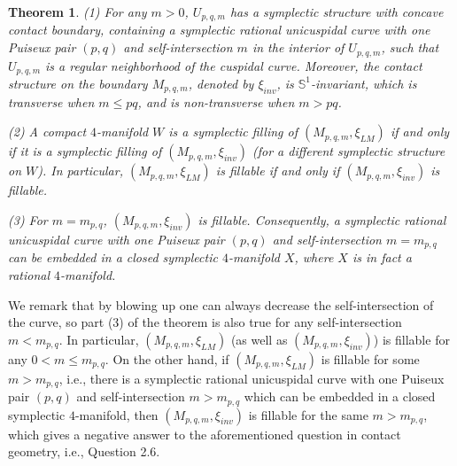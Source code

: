 \documentclass[11pt]{amsart}
\theoremstyle{plain}
\newtheorem{theorem}{Theorem}
\numberwithin{theorem}{section}
\theoremstyle{definition}
\newcommand{\s}{{\mathbb S}}
\begin{document}
\begin{theorem}
(1) For any $m>0$, $U_{p,q,m}$ has a symplectic structure with concave contact boundary, containing a symplectic rational unicuspidal curve with one Puiseux pair $(p,q)$ and  self-intersection $m$ in the interior of $U_{p,q,m}$,
such that $U_{p,q,m}$ is a regular neighborhood of the cuspidal curve. Moreover, the contact structure on the boundary $M_{p,q,m}$, denoted by $\xi_{inv}$, is $\s^1$-invariant, which is transverse when $m\leq pq$, and is non-transverse when $m>pq$.

(2) A compact $4$-manifold $W$ is a symplectic filling of $(M_{p,q,m}, \xi_{LM})$ if and only if it is a
symplectic filling of $(M_{p,q,m}, \xi_{inv})$ (for a different symplectic structure on $W$). In particular, 
$(M_{p,q,m}, \xi_{LM})$ is fillable if and only if $(M_{p,q,m}, \xi_{inv})$ is fillable. 

(3) For $m=m_{p,q}$, $(M_{p,q,m}, \xi_{inv})$ is fillable. Consequently, a symplectic rational unicuspidal curve with one Puiseux pair $(p,q)$ and  self-intersection $m=m_{p,q}$ can be embedded in a
closed symplectic $4$-manifold $X$, where $X$ is in fact a rational $4$-manifold. 
\end{theorem}

We remark that by blowing up one can always decrease the self-intersection of the curve, so part (3) of the theorem is also true for any self-intersection $m<m_{p,q}$. In particular, $(M_{p,q,m}, \xi_{LM})$ (as well as 
$(M_{p,q,m}, \xi_{inv})$) is fillable for any $0<m\leq m_{p,q}$. On the other hand, if 
$(M_{p,q,m}, \xi_{LM})$ is fillable for some $m>m_{p,q}$, i.e., there is a symplectic rational unicuspidal curve with one Puiseux pair $(p,q)$ and self-intersection $m>m_{p,q}$ which can be embedded in a closed symplectic $4$-manifold, then $(M_{p,q,m}, \xi_{inv})$ is fillable for the same $m>m_{p,q}$, which gives a negative answer to the aforementioned question in contact geometry, i.e., Question 2.6. 
\end{document}
